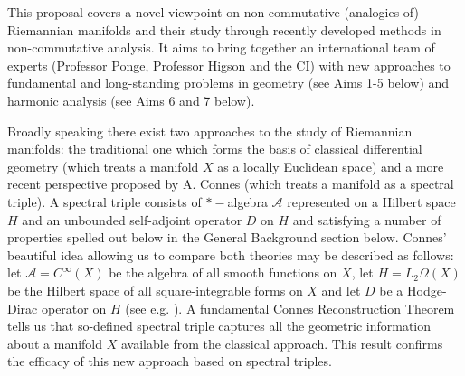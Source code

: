 \documentclass[12pt]{article}
\begin{document}
%
%
%




This proposal covers a novel viewpoint on non-commutative (analogies of) Riemannian manifolds and their study through recently developed methods in non-commutative analysis. It aims to bring together an international team of experts (Professor Ponge, Professor Higson and the CI) with new approaches to fundamental and long-standing problems in geometry (see Aims 1-5 below) and harmonic analysis (see Aims 6 and 7 below).

Broadly speaking there exist two approaches to the study of Riemannian manifolds: the  traditional one which forms the basis of classical differential geometry (which treats a manifold $X$ as a locally Euclidean space) and a more recent perspective proposed by A. Connes (which treats a manifold as a spectral triple). A spectral triple consists of $\ast-$algebra $\mathcal{A}$ represented on a Hilbert space $H$ and an unbounded self-adjoint operator $D$ on $H$ and satisfying a number of properties spelled out below in the General Background section below. Connes' beautiful idea \cite{Connes-book} allowing us to compare both theories may be described as follows: let  $\mathcal{A}=C^{\infty}(X)$ be the algebra of all smooth functions on $X$, let $H=L_2\Omega(X)$ be the Hilbert space of all square-integrable forms on $X$ and let $D$ be a Hodge-Dirac operator on $H$ (see e.g. \cite{BGV}). A fundamental Connes Reconstruction Theorem \cite{Connes-reconstruction} tells us that so-defined spectral triple captures all the geometric information about a manifold $X$ available from the classical approach. This result confirms the efficacy of this new approach based on spectral triples.
\end{document}
